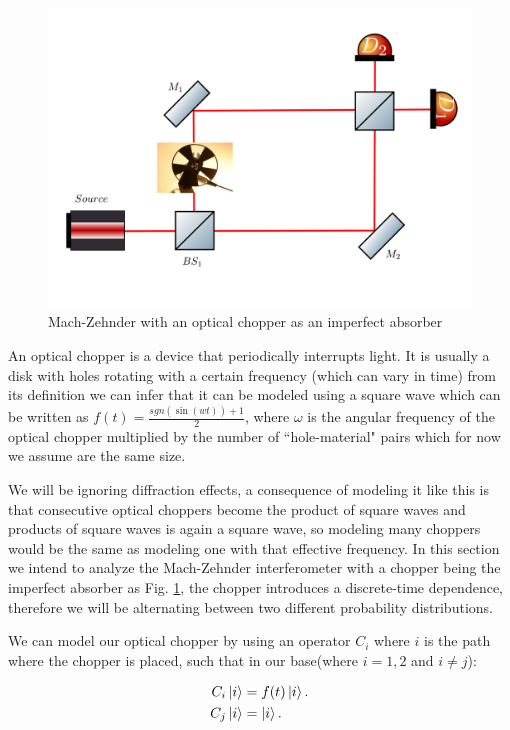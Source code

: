 \documentclass{book}
\begin{document}
 \begin{figure}[h!]
\centering
\includegraphics[width=\linewidth]{images/machzenhderchopper.png}
\caption{Mach-Zehnder with an optical chopper as an imperfect absorber}
\label{chopper}
\end{figure}
An optical chopper is a device that periodically interrupts light. It is usually a disk with holes rotating with a certain frequency (which can vary in time) from its definition we can infer that it can be modeled using a square wave which can be written as  $f(t)=\frac{sgn(\sin(wt))+1}{2}$, where $\omega$ is the angular frequency of the optical chopper multiplied by the number of ``hole-material" pairs which for now we assume are the same size.
 
We will be ignoring diffraction effects, a consequence of modeling it like this is that consecutive optical choppers become the product of square waves and products of square waves is again a square wave, so modeling many choppers would be the same as modeling one with that effective frequency. In this section we intend to analyze the Mach-Zehnder interferometer with a chopper being the imperfect absorber as Fig. \ref{chopper}, the chopper introduces a discrete-time dependence, therefore we will be alternating between two different probability distributions.


We can model our optical chopper by using an operator $C_{i}$ where $i$ is the path where the chopper is placed, such that in our base(where $i=1,2$ and $i \neq j$):

\begin{align}
C_{i}\ket{i}&=f(t)\ket{i}.\\
C_{j}\ket{i}&=\ket{i}.
\end{align}
\end{document}
